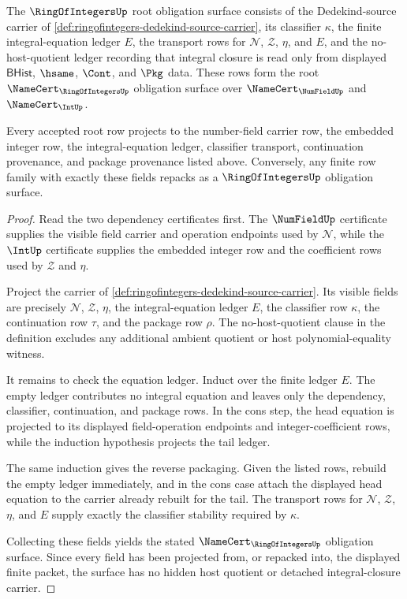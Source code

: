 \begin{theorem}\label{thm:ringofintegers-integral-closure-obligation-surface}
The $\RingOfIntegersUp$ root obligation surface consists of the
Dedekind-source carrier of
\autoref{def:ringofintegers-dedekind-source-carrier}, its classifier
$\kappa$, the finite integral-equation ledger $E$, the transport rows for
$\mathcal N$, $\mathcal Z$, $\eta$, and $E$, and the no-host-quotient ledger
recording that integral closure is read only from displayed $\mathsf{BHist}$,
$\hsame$, $\Cont$, and $\Pkg$ data. These rows form the root
$\NameCert_{\RingOfIntegersUp}$ obligation surface over
$\NameCert_{\NumFieldUp}$ and $\NameCert_{\IntUp}$.

Every accepted root row projects to the number-field carrier row, the embedded
integer row, the integral-equation ledger, classifier transport, continuation
provenance, and package provenance listed above. Conversely, any finite row
family with exactly these fields repacks as a $\RingOfIntegersUp$ obligation
surface.
\end{theorem}
\begin{proof}
Read the two dependency certificates first. The $\NumFieldUp$ certificate
supplies the visible field carrier and operation endpoints used by
$\mathcal N$, while the $\IntUp$ certificate supplies the embedded integer row
and the coefficient rows used by $\mathcal Z$ and $\eta$.

Project the carrier of
\autoref{def:ringofintegers-dedekind-source-carrier}. Its visible fields are
precisely $\mathcal N$, $\mathcal Z$, $\eta$, the integral-equation ledger
$E$, the classifier row $\kappa$, the continuation row $\tau$, and the package
row $\rho$. The no-host-quotient clause in the definition excludes any additional
ambient quotient or host polynomial-equality witness.

It remains to check the equation ledger. Induct over the finite ledger $E$. The
empty ledger contributes no integral equation and leaves only the dependency,
classifier, continuation, and package rows. In the cons step, the head equation
is projected to its displayed field-operation endpoints and integer-coefficient
rows, while the induction hypothesis projects the tail ledger.

The same induction gives the reverse packaging. Given the listed rows, rebuild
the empty ledger immediately, and in the cons case attach the displayed head
equation to the carrier already rebuilt for the tail. The transport rows for
$\mathcal N$, $\mathcal Z$, $\eta$, and $E$ supply exactly the classifier
stability required by $\kappa$.

Collecting these fields yields the stated $\NameCert_{\RingOfIntegersUp}$
obligation surface. Since every field has been projected from, or repacked into,
the displayed finite packet, the surface has no hidden host quotient or detached
integral-closure carrier.
\end{proof}

